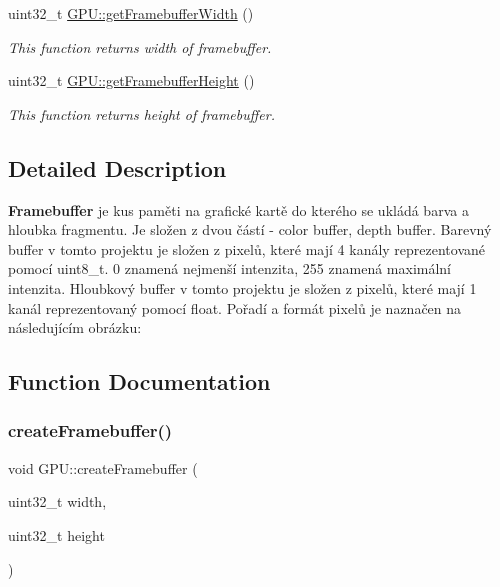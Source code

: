 \begin{DoxyCompactItemize}
uint32\+\_\+t \hyperlink{group__framebuffer__tasks_ga467b565d440e5742b7ebc104a2d70ce3}{G\+P\+U\+::get\+Framebuffer\+Width} ()
\begin{DoxyCompactList}\small\item\em This function returns width of framebuffer. \end{DoxyCompactList}\item 
uint32\+\_\+t \hyperlink{group__framebuffer__tasks_gaa115f7153407b8020fd153b71abccf0e}{G\+P\+U\+::get\+Framebuffer\+Height} ()
\begin{DoxyCompactList}\small\item\em This function returns height of framebuffer. \end{DoxyCompactList}\end{DoxyCompactItemize}


\subsection{Detailed Description}
{\bfseries  Framebuffer } je kus paměti na grafické kartě do kterého se ukládá barva a hloubka fragmentu. Je složen z dvou částí -\/ color buffer, depth buffer. Barevný buffer v tomto projektu je složen z pixelů, které mají 4 kanály reprezentované pomocí uint8\+\_\+t. 0 znamená nejmenší intenzita, 255 znamená maximální intenzita. Hloubkový buffer v tomto projektu je složen z pixelů, které mají 1 kanál reprezentovaný pomocí float. Pořadí a formát pixelů je naznačen na následujícím obrázku\+:



\subsection{Function Documentation}
\mbox{\label{group__framebuffer__tasks_gab041c171fc07011d13ec608fc94a1d1c}} 
\subsubsection{\texorpdfstring{create\+Framebuffer()}{createFramebuffer()}}
{\footnotesize\ttfamily void G\+P\+U\+::create\+Framebuffer (\begin{DoxyParamCaption}\item[{uint32\+\_\+t}]{width,  }\item[{uint32\+\_\+t}]{height }\end{DoxyParamCaption})}




